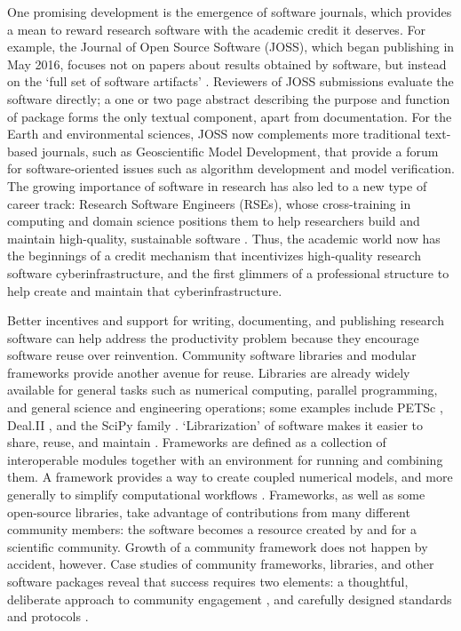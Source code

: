\documentclass{article} %
\begin{document}
One promising development is the emergence of software journals, which provides a mean to reward research software with the academic credit it deserves. For example, the Journal of Open Source Software (JOSS), which began publishing in May 2016, focuses not on papers about results obtained by software, but instead on the `full set of software artifacts' \citep{smith2018journal}. Reviewers of JOSS submissions evaluate the software directly; a one or two page abstract describing the purpose and function of package forms the only textual component, apart from documentation. For the Earth and environmental sciences, JOSS now complements more traditional text-based journals, such as Geoscientific Model Development, that provide a forum for software-oriented issues such as algorithm development and model verification. The growing importance of software in research has also led to a new type of career track: Research Software Engineers (RSEs), whose cross-training in computing and domain science positions them to help researchers build and maintain high-quality, sustainable software \citep{baxter2012research}. Thus, the academic world now has the beginnings of a credit mechanism that incentivizes high-quality research software cyberinfrastructure, and the first glimmers of a professional structure to help create and maintain that cyberinfrastructure. 

Better incentives and support for writing, documenting, and publishing research software can help address the productivity problem because they encourage software reuse over reinvention. Community software libraries and modular frameworks provide another avenue for reuse. Libraries are already widely available for general tasks such as numerical computing, parallel programming, and general science and engineering operations; some examples include PETSc \citep{abhyankar2018petsc}, Deal.II \citep{bangerth2007deal}, and the SciPy family \citep{2020SciPy-NMeth}. `Librarization' of software makes it easier to share, reuse, and maintain \citep{brown2014run}. Frameworks are defined as a collection of interoperable modules together with an environment for running and combining them. A framework provides a way to create coupled numerical models, and more generally to simplify computational workflows \citep[e.g.,][]{leavesley1996modular,voinov2004modular,peckham2013component}. Frameworks, as well as some open-source libraries, take advantage of contributions from many different community members: the software becomes a resource created by and for a scientific community. Growth of a community framework does not happen by accident, however. Case studies of community frameworks, libraries, and other software packages reveal that success requires two elements: a thoughtful, deliberate approach to community engagement \citep{bangerth2013makes,turk2013scaling,lawrence2015science}, and carefully designed standards and protocols \citep{peckham2013component,harpham2019introductory}.
\end{document}
